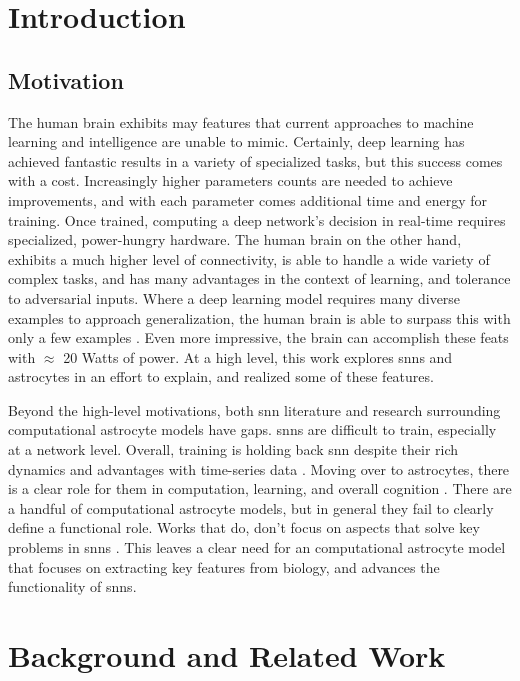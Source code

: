 \chapter{Introduction}\label{section:introduction}
\section{Motivation}
The human brain exhibits may features that current approaches to machine
learning and intelligence are unable to mimic. Certainly, deep learning has
achieved fantastic results in a variety of specialized tasks, but this success
comes with a cost. Increasingly higher parameters counts are needed to
achieve improvements, and with each parameter comes additional time and energy
for training. Once trained, computing a deep network's decision in real-time
requires specialized, power-hungry hardware. The human brain on the other hand,
exhibits a much higher level of connectivity, is able to handle a wide variety
of complex tasks, and has many advantages in the context of learning, and
tolerance to adversarial inputs. Where a deep learning model requires many
diverse examples to approach generalization, the human brain is able to
surpass this with only a few examples \parencite{tsimenidis_2020}. Even more
impressive, the brain can accomplish these feats with $\approx$ 20 Watts of
power. At a high level, this work explores \glspl{snn} and astrocytes in an
effort to explain, and realized some of these features.

Beyond the high-level motivations, both \gls{snn} literature and research
surrounding computational astrocyte models have gaps. \glspl{snn} are difficult
to train, especially at a network level. Overall, training is holding back
\gls{snn} despite their rich dynamics and advantages with time-series data
\parencite{tavanaei_2019}. Moving over to astrocytes, there is a clear role for
them in computation, learning, and overall cognition
\parencite{mederos_2018}. There are a handful of computational astrocyte models,
but in general they fail to clearly define a functional role. Works that do,
don't focus on aspects that solve key problems in \glspl{snn}
\parencite{manninen_2019}. This leaves a clear need for an computational
astrocyte model that focuses on extracting key features from biology, and
advances the functionality of \glspl{snn}.


\chapter{Background and Related Work}\label{chapter:background}
